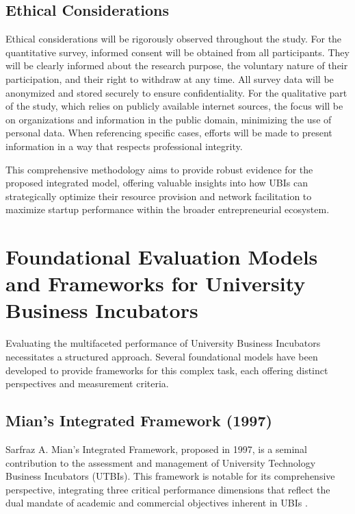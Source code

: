 \documentclass[../Main.tex]{subfiles}
\begin{document}
\subsection{Ethical Considerations}
Ethical considerations will be rigorously observed throughout the study. For the quantitative survey, informed consent will be obtained from all participants. They will be clearly informed about the research purpose, the voluntary nature of their participation, and their right to withdraw at any time. All survey data will be anonymized and stored securely to ensure confidentiality. For the qualitative part of the study, which relies on publicly available internet sources, the focus will be on organizations and information in the public domain, minimizing the use of personal data. When referencing specific cases, efforts will be made to present information in a way that respects professional integrity.

This comprehensive methodology aims to provide robust evidence for the proposed integrated model, offering valuable insights into how UBIs can strategically optimize their resource provision and network facilitation to maximize startup performance within the broader entrepreneurial ecosystem.

\section{Foundational Evaluation Models and Frameworks for University Business Incubators}
Evaluating the multifaceted performance of University Business Incubators necessitates a structured approach. Several foundational models have been developed to provide frameworks for this complex task, each offering distinct perspectives and measurement criteria.

\subsection{Mian's Integrated Framework (1997)}
Sarfraz A. Mian's Integrated Framework, proposed in 1997, is a seminal contribution to the assessment and management of University Technology Business Incubators (UTBIs). This framework is notable for its comprehensive perspective, integrating three critical performance dimensions that reflect the dual mandate of academic and commercial objectives inherent in UBIs \cite{Chan2005Assessing}.
\end{document}
